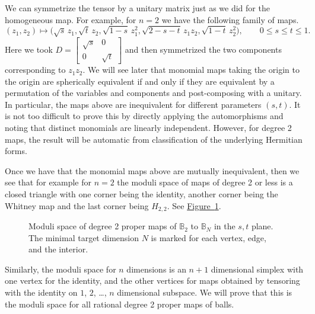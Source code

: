 \documentclass[12pt,openany]{book}
\newcommand{\bB}{{\mathbb{B}}}
\theoremstyle{plain}
\theoremstyle{remark}
\theoremstyle{definition}
\theoremstyle{exercise}
\theoremstyle{example}
\newcommand{\figureref}[1]{\hyperref[#1]{Figure~\ref*{#1}}}
\begin{document}
We can symmetrize the tensor by a unitary matrix
just as we did for the homogeneous map.
For example, for $n=2$ we have the following family of maps.
\begin{equation}
(z_1,z_2) \mapsto
\bigl(
\sqrt{s} \, z_1,
\sqrt{t} \, z_2,
\sqrt{1-s} \, z_1^2,
\sqrt{2-s-t} \, z_1z_2,
\sqrt{1-t} \, z_2^2 \bigr) , \qquad
0 \leq s \leq t \leq 1.
\end{equation}
Here we took $D =
\left[
\begin{smallmatrix}
\sqrt{s} & 0 \\
0 & \sqrt{t}
\end{smallmatrix}
\right]$ and then symmetrized the two components corresponding to $z_1z_2$.
We will see later that monomial maps taking the origin to the origin
are spherically
equivalent if and only if they are equivalent by a permutation of the
variables and components and post-composing with a unitary.  In particular,
the maps above are inequivalent for different parameters $(s,t)$.
It is not
too difficult to prove this by directly applying the automorphisms and noting
that distinct monomials are linearly independent.  However, for degree 2
maps,
the result will be automatic from classification of the underlying Hermitian
forms.

Once we have that the monomial maps above are mutually inequivalent, then
we see that for example for $n=2$ the moduli space of maps of degree 2
or less is a
closed triangle with one corner being the identity, another corner being the
Whitney map and the last corner being $H_{2,2}$.  See
\figureref{fig:modulispace}.

\begin{figure}[h!t]
\begin{center}

\medskip
\caption{Moduli space of degree 2 proper maps of $\bB_2$ to
$\bB_N$ in the $s,t$ plane.
The minimal target dimension $N$ is marked for each vertex, edge, and the interior.\label{fig:modulispace}}
\end{center}
\end{figure}

Similarly, the moduli space for $n$ dimensions is an $n+1$ dimensional
simplex with one vertex for the identity, and the other vertices for maps
obtained by tensoring with the identity on $1$, $2$, \ldots, $n$ dimensional
subspace.
We will prove that this is the moduli space for all rational degree 2 proper maps
of balls.


\end{document}
